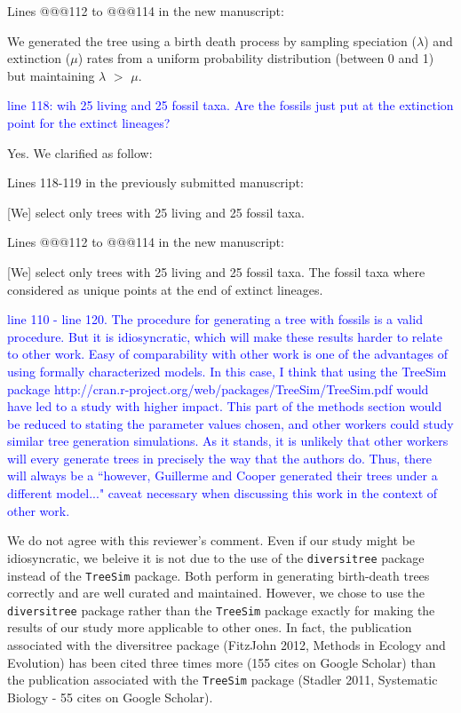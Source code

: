 \documentclass[11pt]{letter}
\begin{document}
\begin{letter}{}
Lines @@@112 to @@@114 in the new manuscript:

\hfill\begin{minipage}{\dimexpr\textwidth-1cm}
We generated the tree using a birth death process by sampling speciation ($\lambda$) and extinction ($\mu$) rates from a uniform probability distribution (between 0 and 1) but maintaining $\lambda$ $>$ $\mu$.
\end{minipage}


\textcolor{blue}{line 118: wih 25 living and 25 fossil taxa. Are the fossils just put at the extinction point for the extinct lineages?}

Yes. We clarified as follow:

Lines 118-119 in the previously submitted manuscript:

\hfill\begin{minipage}{\dimexpr\textwidth-1cm}
[We] select only trees with 25 living and 25 fossil taxa.
\end{minipage}

Lines @@@112 to @@@114 in the new manuscript:

\hfill\begin{minipage}{\dimexpr\textwidth-1cm}
[We] select only trees with 25 living and 25 fossil taxa. The fossil taxa where considered as unique points at the end of extinct lineages.
\end{minipage}


\textcolor{blue}{line 110 - line 120. The procedure for generating a tree with fossils is a valid procedure. But it is idiosyncratic, which will make these results harder to relate to other work. Easy of comparability with other work is one of the advantages of using formally characterized models. In this case, I think that using the TreeSim package http://cran.r-project.org/web/packages/TreeSim/TreeSim.pdf would have led to a study with higher impact. This part of the methods section would be reduced to stating the parameter values chosen, and other workers could study similar tree generation simulations. As it stands, it is unlikely that other workers will every generate trees in precisely the way that the authors do. Thus, there will always be a ``however, Guillerme and Cooper generated their trees under a different model..." caveat necessary when discussing this work in the context of other work.}

We do not agree with this reviewer's comment. Even if our study might be idiosyncratic, we beleive it is not due to the use of the \texttt{diversitree} package instead of the \texttt{TreeSim} package. Both perform in generating birth-death trees correctly and are well curated and maintained. However, we chose to use the \texttt{diversitree} package rather than the \texttt{TreeSim} package exactly for making the results of our study more applicable to other ones. In fact, the publication associated with the diversitree package (FitzJohn 2012, Methods in Ecology and Evolution) has been cited three times more (155 cites on Google Scholar) than the publication associated with the \texttt{TreeSim} package (Stadler 2011, Systematic Biology - 55 cites on Google Scholar).


\end{letter}
\end{document}

